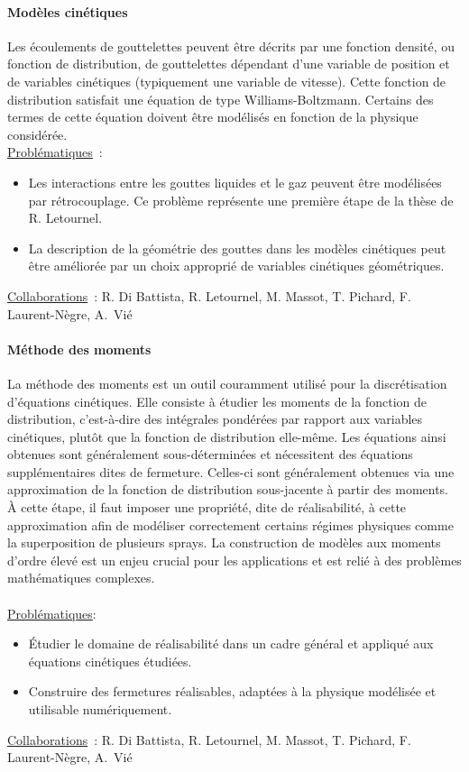 \documentclass[12pt]{article}
\begin{document}
\paragraph{Modèles cinétiques\\ } 
Les écoulements de gouttelettes peuvent être décrits par une fonction densité, ou fonction de distribution, de gouttelettes dépendant d'une variable de position et de variables cinétiques (typiquement une variable de vitesse). Cette fonction de distribution satisfait une équation de type Williams-Boltzmann. Certains des termes de cette équation doivent être modélisés en fonction de la physique considérée. \\
%
\underline{Problématiques}~: \begin{itemize}
\item Les interactions entre les gouttes liquides et le gaz peuvent être modélisées par rétrocouplage. Ce problème représente une première étape de la thèse de R. Letournel.
\item La description de la géométrie des gouttes dans les modèles cinétiques peut être améliorée par un choix approprié de variables cinétiques géométriques. 
\end{itemize}
\underline{Collaborations}~: R. Di Battista, R. Letournel, M. Massot, T. Pichard, F. Laurent-Nègre, A.~Vié


\paragraph{Méthode des moments\\ }
La méthode des moments est un outil couramment utilisé pour la discrétisation d'équations cinétiques. Elle consiste à étudier les moments de la fonction de distribution, c'est-à-dire des intégrales pondérées par rapport aux variables cinétiques, plutôt que la fonction de distribution elle-même. Les équations ainsi obtenues sont généralement sous-déterminées et nécessitent des équations supplémentaires dites de fermeture. Celles-ci sont généralement obtenues via une approximation de la fonction de distribution sous-jacente à partir des moments. À cette étape, il faut imposer une propriété, dite de réalisabilité, à cette approximation afin de modéliser correctement certains régimes physiques comme la superposition de plusieurs sprays. La construction de modèles aux moments d'ordre élevé est un enjeu crucial pour les applications et est relié à des problèmes mathématiques complexes.\\ \\
%
\underline{Problématiques}:\begin{itemize}
\item Étudier le domaine de réalisabilité dans un cadre général et appliqué aux équations cinétiques étudiées.
\item Construire des fermetures réalisables, adaptées à la physique modélisée et utilisable numériquement.
\end{itemize}
\underline{Collaborations}~: R. Di Battista, R. Letournel, M. Massot, T. Pichard, F. Laurent-Nègre, A.~Vié
\end{document}
